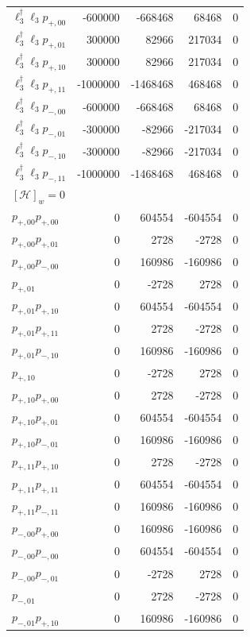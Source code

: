 \begin{longtable}{@{}lrrrr@{}}
$\ell_{3}^\dagger \ell_{3} p_{+,00}$ & -600000 & -668468 & 68468 & 0 \\
$\ell_{3}^\dagger \ell_{3} p_{+,01}$ & 300000 & 82966 & 217034 & 0 \\
$\ell_{3}^\dagger \ell_{3} p_{+,10}$ & 300000 & 82966 & 217034 & 0 \\
$\ell_{3}^\dagger \ell_{3} p_{+,11}$ & -1000000 & -1468468 & 468468 & 0 \\
$\ell_{3}^\dagger \ell_{3} p_{-,00}$ & -600000 & -668468 & 68468 & 0 \\
$\ell_{3}^\dagger \ell_{3} p_{-,01}$ & -300000 & -82966 & -217034 & 0 \\
$\ell_{3}^\dagger \ell_{3} p_{-,10}$ & -300000 & -82966 & -217034 & 0 \\
$\ell_{3}^\dagger \ell_{3} p_{-,11}$ & -1000000 & -1468468 & 468468 & 0 \\
\midrule
\multicolumn{5}{l}{$[\mathcal H]_w=0$}\\
\midrule
$p_{+,00} p_{+,00}$ & 0 & 604554 & -604554 & 0 \\
$p_{+,00} p_{+,01}$ & 0 & 2728 & -2728 & 0 \\
$p_{+,00} p_{-,00}$ & 0 & 160986 & -160986 & 0 \\
$p_{+,01}$ & 0 & -2728 & 2728 & 0 \\
$p_{+,01} p_{+,10}$ & 0 & 604554 & -604554 & 0 \\
$p_{+,01} p_{+,11}$ & 0 & 2728 & -2728 & 0 \\
$p_{+,01} p_{-,10}$ & 0 & 160986 & -160986 & 0 \\
$p_{+,10}$ & 0 & -2728 & 2728 & 0 \\
$p_{+,10} p_{+,00}$ & 0 & 2728 & -2728 & 0 \\
$p_{+,10} p_{+,01}$ & 0 & 604554 & -604554 & 0 \\
$p_{+,10} p_{-,01}$ & 0 & 160986 & -160986 & 0 \\
$p_{+,11} p_{+,10}$ & 0 & 2728 & -2728 & 0 \\
$p_{+,11} p_{+,11}$ & 0 & 604554 & -604554 & 0 \\
$p_{+,11} p_{-,11}$ & 0 & 160986 & -160986 & 0 \\
$p_{-,00} p_{+,00}$ & 0 & 160986 & -160986 & 0 \\
$p_{-,00} p_{-,00}$ & 0 & 604554 & -604554 & 0 \\
$p_{-,00} p_{-,01}$ & 0 & -2728 & 2728 & 0 \\
$p_{-,01}$ & 0 & 2728 & -2728 & 0 \\
$p_{-,01} p_{+,10}$ & 0 & 160986 & -160986 & 0 \\

\end{longtable}

